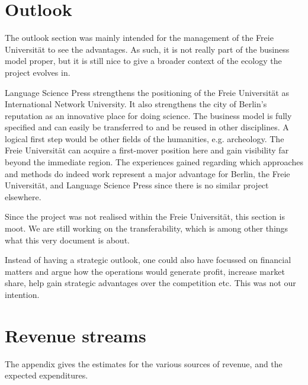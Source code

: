 \documentclass[output=guidelines,nonflat,smallfont,
draftmode
]{langsci/langscibook}
\newcommand{\background}[1]{ 
  \vspace{5mm}
  \renewcommand{\tblslinecolour}{lsDarkBlue}
  \tblssy[red]{explore2}{Background}{\vspace*{-5mm}#1}
}
\newcommand{\langscisolution}[1]{
  \renewcommand{\tblslinecolour}{lsLightBlue}
  \tblssy{langsci}{LangSci solution}{\vspace*{-5mm}#1}
}
\newcommand{\evaluation}[1]{
  \renewcommand{\tblslinecolour}{lsLightOrange}
  \tblssy{receipt}{Evaluation}{\vspace*{-5mm}#1}
}
\newcommand{\othersolutions}[1]{
  \renewcommand{\tblslinecolour}{lsDarkGreenOne}
  \tblssy{more}{Other solutions}{\vspace*{-5mm}#1}
}
\renewcommand{\tblssy}[4][black!12]{%
  \renewcommand{\langscisymbol}{#2}\renewcommand{\tblsboxcolor}{#1}
  \begin{mdframed}[style=yellowexercise,frametitle={#3}]
    #4
  \end{mdframed}
}
\begin{document}
\chapter{Outlook}

\background{The outlook section was mainly intended for the management of the Freie Universität to see the advantages. As such, it is not really part of the business model proper, but it is still nice to give a broader context of the ecology the project evolves in.}
\langscisolution{
Language Science Press strengthens the positioning of the Freie Universität as International Network University. It also strengthens the city of Berlin's reputation as an innovative place for doing science. The business model is fully specified and can easily be transferred to and be reused in other disciplines. A logical first step would be other fields of the humanities, e.g. archeology. The Freie Universität can acquire a first-mover position here and gain visibility far beyond the immediate region. The experiences gained regarding which approaches and methods do indeed work represent a major advantage for Berlin, the Freie Universität, and Language Science Press since there is no similar project elsewhere. 
}
\evaluation{Since the project was not realised within the Freie Universität, this section is moot. We are still working on the transferability, which is among other things what this very document is about.}
\othersolutions{
Instead of having a strategic outlook, one could also have focussed on financial matters and argue how the operations would generate profit, increase market share, help gain strategic advantages over the competition etc. This was not our intention. 
}
 

\appendix
\chapter{Revenue streams}
The appendix gives the estimates for the various sources of revenue, and the expected expenditures.
\end{document}
